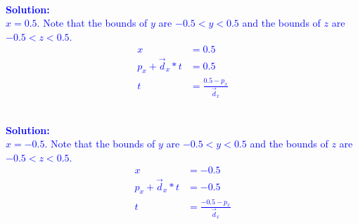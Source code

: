 \documentclass[10pt,twocolumn]{article}
\newcommand{\solution}[1]{\textcolor{Blue}{\\{\bf Solution:} \\ #1}}  %
\begin{document}
\begin{framed}
\solution{
$x = 0.5$.
Note that the bounds of $y$ are
$ -0.5 < y < 0.5 $
and the bounds of $z$ are
$ -0.5 < z < 0.5$.
\begin{align*}
x &= 0.5 \\
p_x + \vec{d}_x * t &= 0.5 \\
t &= \frac{0.5 - p_x}{\vec{d}_x}
\end{align*}
}
\end{framed}
\begin{framed}
\solution{
$x = -0.5$.
Note that the bounds of $y$ are
$ -0.5 < y < 0.5 $
and the bounds of $z$ are
$ -0.5 < z < 0.5$.
\begin{align*}
x &= -0.5 \\
p_x + \vec{d}_x * t &= -0.5 \\
t &= \frac{-0.5 - p_x}{\vec{d}_x}
\end{align*}
}
\end{framed}
\end{document}
